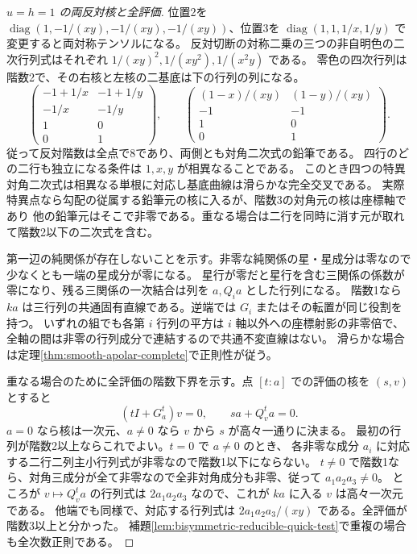 \begin{proof}[$u=h=1$ の両反対核と全評価]
位置2を $\operatorname{diag}(1,-1/(xy),-1/(xy),-1/(xy))$、位置3を
$\operatorname{diag}(1,1,1/x,1/y)$ で変更すると両対称テンソルになる。
反対切断の対称二乗の三つの非自明色の二次行列式はそれぞれ $1/(xy)^2,1/(xy^2),1/(x^2y)$ である。
零色の四次行列は階数2で、その右核と左核の二基底は下の行列の列になる。
\[
 \begin{pmatrix}
 -1+1/x&-1+1/y\\ -1/x&-1/y\\1&0\\0&1
 \end{pmatrix},\qquad
 \begin{pmatrix}
 (1-x)/(xy)&(1-y)/(xy)\\-1&-1\\1&0\\0&1
 \end{pmatrix}.
\]
従って反対階数は全点で8であり、両側とも対角二次式の鉛筆である。
四行のどの二行も独立になる条件は $1,x,y$ が相異なることである。
このとき四つの特異対角二次式は相異なる単根に対応し基底曲線は滑らかな完全交叉である。
実際特異点なら勾配の従属する鉛筆元の核に入るが、階数3の対角元の核は座標軸であり
他の鉛筆元はそこで非零である。重なる場合は二行を同時に消す元が取れて階数2以下の二次式を含む。

第一辺の純関係が存在しないことを示す。非零な純関係の星・星成分は零なので少なくとも一端の星成分が零になる。
星行が零だと星行を含む三関係の係数が零になり、残る三関係の一次結合は列を $a,Q_i a$ とした行列になる。
階数1なら $ka$ は三行列の共通固有直線である。逆端では $G_i$ またはその転置が同じ役割を持つ。
いずれの組でも各第 $i$ 行列の平方は $i$ 軸以外への座標射影の非零倍で、
全軸の間は非零の行列成分で連結するので共通不変直線はない。
滑らかな場合は定理\ref{thm:smooth-apolar-complete}で正則性が従う。

重なる場合のために全評価の階数下界を示す。点 $[t:a]$ での評価の核を $(s,v)$ とすると
\[
       (tI+G_a^t)v=0,\qquad s a+Q_v^t a=0 .
\]
$a=0$ なら核は一次元、$a\ne0$ なら $v$ から $s$ が高々一通りに決まる。
最初の行列が階数2以上ならこれでよい。$t=0$ で $a\ne0$ のとき、
各非零な成分 $a_i$ に対応する二行二列主小行列式が非零なので階数1以下にならない。
$t\ne0$ で階数1なら、対角三成分が全て非零なので全非対角成分も非零、従って $a_1a_2a_3\ne0$。
ところが $v\mapsto Q_v^t a$ の行列式は $2a_1a_2a_3$ なので、これが $ka$ に入る $v$ は高々一次元である。
他端でも同様で、対応する行列式は $2a_1a_2a_3/(xy)$ である。全評価が階数3以上と分かった。
補題\ref{lem:bisymmetric-reducible-quick-test}で重複の場合も全次数正則である。
\end{proof}

